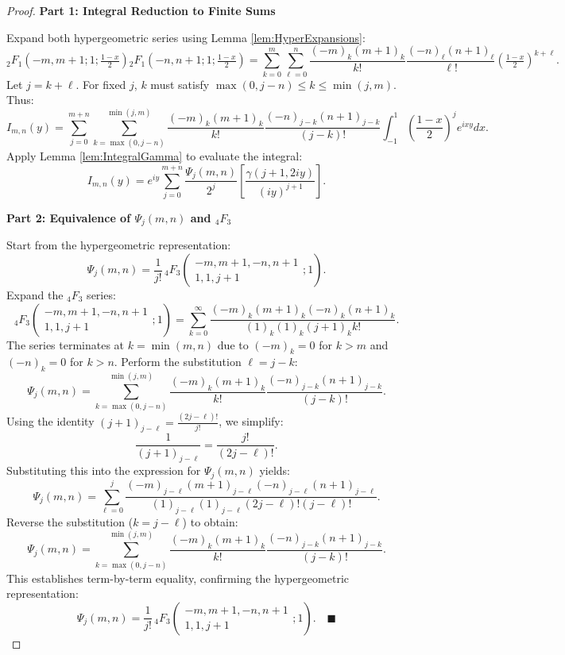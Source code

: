 \documentclass[12pt]{article}
\begin{document}
\begin{proof}
\textbf{Part 1: Integral Reduction to Finite Sums}

Expand both hypergeometric series using Lemma \ref{lem:HyperExpansions}:
\[
{}_2F_1\left(-m,m+1;1;\tfrac{1-x}{2}\right){}_2F_1\left(-n,n+1;1;\tfrac{1-x}{2}\right) = \sum_{k=0}^m \sum_{\ell=0}^n \frac{(-m)_k(m+1)_k}{k!} \frac{(-n)_\ell(n+1)_\ell}{\ell!} \left(\tfrac{1-x}{2}\right)^{k+\ell}.
\]
Let \( j = k + \ell \). For fixed \( j \), \( k \) must satisfy \( \max(0,j-n) \leq k \leq \min(j,m) \). Thus:
\[
I_{m,n}(y) = \sum_{j=0}^{m+n} \sum_{k=\max(0,j-n)}^{\min(j,m)} \frac{(-m)_k(m+1)_k}{k!} \frac{(-n)_{j-k}(n+1)_{j-k}}{(j-k)!} \int_{-1}^1 \left(\frac{1-x}{2}\right)^j e^{ixy}dx.
\]
Apply Lemma \ref{lem:IntegralGamma} to evaluate the integral:
\[
I_{m,n}(y) = e^{iy}\sum_{j=0}^{m+n}\frac{\Psi_j(m,n)}{2^j}\left[\frac{\gamma(j+1,2iy)}{(iy)^{j+1}}\right].
\]

\textbf{Part 2: Equivalence of \( \Psi_j(m,n) \) and \( {}_4F_3 \)}

Start from the hypergeometric representation:
\[
\Psi_j(m,n) = \frac{1}{j!}\,{}_4F_3\left(\begin{array}{c} -m, m+1, -n, n+1 \\ 1, 1, j+1 \end{array};1\right).
\]
Expand the \( {}_4F_3 \) series:
\[
{}_4F_3\left(\begin{array}{c} -m, m+1, -n, n+1 \\ 1, 1, j+1 \end{array};1\right) = \sum_{k=0}^\infty \frac{(-m)_k(m+1)_k(-n)_k(n+1)_k}{(1)_k(1)_k(j+1)_k k!}.
\]
The series terminates at \( k = \min(m,n) \) due to \((-m)_k = 0\) for \( k > m \) and \((-n)_k = 0\) for \( k > n \). Perform the substitution \( \ell = j - k \):
\[
\Psi_j(m,n) = \sum_{k=\max(0,j-n)}^{\min(j,m)} \frac{(-m)_k(m+1)_k}{k!}\frac{(-n)_{j-k}(n+1)_{j-k}}{(j-k)!}.
\]
Using the identity \((j+1)_{j-\ell} = \frac{(2j - \ell)!}{j!}\), we simplify:
\[
\frac{1}{(j+1)_{j-\ell}} = \frac{j!}{(2j - \ell)!}.
\]
Substituting this into the expression for \( \Psi_j(m,n) \) yields:
\[
\Psi_j(m,n) = \sum_{\ell=0}^j \frac{(-m)_{j-\ell}(m+1)_{j-\ell}(-n)_{j-\ell}(n+1)_{j-\ell}}{(1)_{j-\ell}(1)_{j-\ell}(2j - \ell)!(j - \ell)!}.
\]
Reverse the substitution (\( k = j - \ell \)) to obtain:
\[
\Psi_j(m,n) = \sum_{k=\max(0,j-n)}^{\min(j,m)} \frac{(-m)_k(m+1)_k}{k!}\frac{(-n)_{j-k}(n+1)_{j-k}}{(j-k)!}.
\]
This establishes term-by-term equality, confirming the hypergeometric representation:
\[
\Psi_j(m,n) = \frac{1}{j!}\,{}_4F_3\left(\begin{array}{c} -m, m+1, -n, n+1 \\ 1, 1, j+1 \end{array};1\right). \quad \blacksquare
\]
\end{proof}
\end{document}
